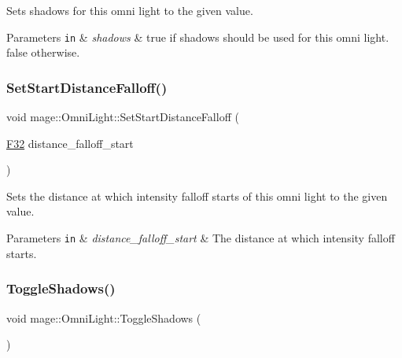 Sets shadows for this omni light to the given value.


\begin{DoxyParams}[1]{Parameters}
\mbox{\tt in}  & {\em shadows} & {\ttfamily true} if shadows should be used for this omni light. {\ttfamily false} otherwise. \\
\hline
\end{DoxyParams}
\hypertarget{classmage_1_1_omni_light_a221f403ca37b500dff1085d2e74f582c}{}\label{classmage_1_1_omni_light_a221f403ca37b500dff1085d2e74f582c} 
\subsubsection{\texorpdfstring{Set\+Start\+Distance\+Falloff()}{SetStartDistanceFalloff()}}
{\footnotesize\ttfamily void mage\+::\+Omni\+Light\+::\+Set\+Start\+Distance\+Falloff (\begin{DoxyParamCaption}\item[{\hyperlink{namespacemage_aa97e833b45f06d60a0a9c4fc22ae02c0}{F32}}]{distance\+\_\+falloff\+\_\+start }\end{DoxyParamCaption})\hspace{0.3cm}{\ttfamily [noexcept]}}

Sets the distance at which intensity falloff starts of this omni light to the given value.


\begin{DoxyParams}[1]{Parameters}
\mbox{\tt in}  & {\em distance\+\_\+falloff\+\_\+start} & The distance at which intensity falloff starts. \\
\hline
\end{DoxyParams}
\hypertarget{classmage_1_1_omni_light_a19164a13e884bce6fbc80b760c82d243}{}\label{classmage_1_1_omni_light_a19164a13e884bce6fbc80b760c82d243} 
\subsubsection{\texorpdfstring{Toggle\+Shadows()}{ToggleShadows()}}
{\footnotesize\ttfamily void mage\+::\+Omni\+Light\+::\+Toggle\+Shadows (\begin{DoxyParamCaption}{ }\end{DoxyParamCaption})\hspace{0.3cm}{\ttfamily [noexcept]}}

